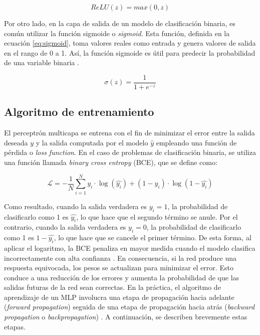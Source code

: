 
\begin{equation}
	\label{eq:relu}
	ReLU(z) = max(0, z)
\end{equation}

Por otro lado, en la capa de salida de un modelo de clasificación binaria, es común utilizar la función sigmoide o 
\emph{sigmoid}. Esta función, definida en la ecuación \ref{eq:sigmoid}, toma valores reales como entrada y genera 
valores de salida en el rango de 0 a 1. Así, la función sigmoide es útil para predecir la probabilidad de una 
variable binaria \citep{CITE:44}. 

\begin{equation}
	\label{eq:sigmoid}
	\sigma(z) = \frac{1} {1 + e^{-z}}
\end{equation}


\subsection{Algoritmo de entrenamiento}
El perceptrón multicapa se entrena con el fin de minimizar el error entre la salida deseada $y$ y 
la salida computada por el modelo $\hat{y}$ empleando una función de pérdida o \emph{loss function}. 
En el caso de problemas de clasificación binaria, se utiliza una función llamada 
\emph{binary cross entropy} (BCE), que se define como:

\begin{equation}
	\label{eq:BCE}
	\mathcal{L} = -\frac{1}{N} \sum_{i=1}^Ny_{i}\cdot\log(\hat{y_{i}}) + (1 - y_{i})\cdot\log(1 - \hat{y_{i}})
\end{equation}

Como resultado, cuando la salida verdadera es $y_{i} = 1$, la probabilidad de clasificarlo como 
1 es  $\hat{y_{i}}$, lo que hace que el segundo término se anule. Por el contrario, cuando la 
salida verdadera es $y_{i} = 0$, la probabilidad de clasificarlo como 1 es  $1 - \hat{y_{i}}$, 
lo que hace que se cancele el primer término. De esta forma, al aplicar el logaritmo, la BCE 
penaliza en mayor medida cuando el modelo clasifica incorrectamente con alta confianza \citep{CITE:46}. 
En consecuencia, si la red produce una respuesta equivocada, los pesos se actualizan para minimizar el error. 
Esto conduce a una reducción de los errores y aumenta la probabilidad de que las salidas futuras de la red 
sean correctas. En la práctica, el algoritmo de aprendizaje de un MLP involucra una etapa de propagación 
hacia adelante (\emph{forward propagation}) seguida de una etapa de propagación hacia atrás (\emph{backward propagation} 
o \emph{backpropagation}) \citep{CITE:35}. A continuación, se describen brevemente estas etapas.

